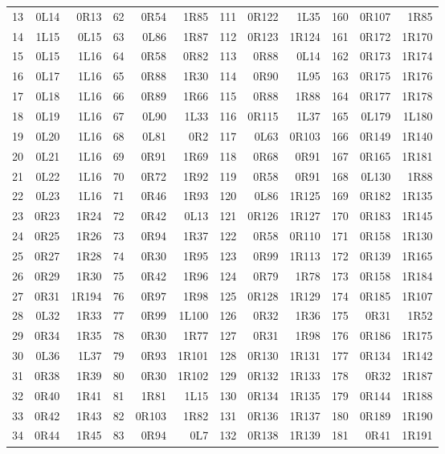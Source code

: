 \begin{center}
\begin{tabular}{@{}rrr@{\hspace{11pt}}rrr@{\hspace{11pt}}rrr@{\hspace{11pt}}rrr@{}}
13 & 0L14 & 0R13 & 62 & 0R54 & 1R85 & 111 & 0R122 & 1L35 & 160 & 0R107 & 1R85 \\
14 & 1L15 & 0L15 & 63 & 0L86 & 1R87 & 112 & 0R123 & 1R124 & 161 & 0R172 & 1R170 \\
15 & 0L15 & 1L16 & 64 & 0R58 & 0R82 & 113 & 0R88 & 0L14 & 162 & 0R173 & 1R174 \\
16 & 0L17 & 1L16 & 65 & 0R88 & 1R30 & 114 & 0R90 & 1L95 & 163 & 0R175 & 1R176 \\
17 & 0L18 & 1L16 & 66 & 0R89 & 1R66 & 115 & 0R88 & 1R88 & 164 & 0R177 & 1R178 \\
18 & 0L19 & 1L16 & 67 & 0L90 & 1L33 & 116 & 0R115 & 1L37 & 165 & 0L179 & 1L180 \\
19 & 0L20 & 1L16 & 68 & 0L81 & 0R2 & 117 & 0L63 & 0R103 & 166 & 0R149 & 1R140 \\
20 & 0L21 & 1L16 & 69 & 0R91 & 1R69 & 118 & 0R68 & 0R91 & 167 & 0R165 & 1R181 \\
21 & 0L22 & 1L16 & 70 & 0R72 & 1R92 & 119 & 0R58 & 0R91 & 168 & 0L130 & 1R88 \\
22 & 0L23 & 1L16 & 71 & 0R46 & 1R93 & 120 & 0L86 & 1R125 & 169 & 0R182 & 1R135 \\
23 & 0R23 & 1R24 & 72 & 0R42 & 0L13 & 121 & 0R126 & 1R127 & 170 & 0R183 & 1R145 \\
24 & 0R25 & 1R26 & 73 & 0R94 & 1R37 & 122 & 0R58 & 0R110 & 171 & 0R158 & 1R130 \\
25 & 0R27 & 1R28 & 74 & 0R30 & 1R95 & 123 & 0R99 & 1R113 & 172 & 0R139 & 1R165 \\
26 & 0R29 & 1R30 & 75 & 0R42 & 1R96 & 124 & 0R79 & 1R78 & 173 & 0R158 & 1R184 \\
27 & 0R31 & 1R194 & 76 & 0R97 & 1R98 & 125 & 0R128 & 1R129 & 174 & 0R185 & 1R107 \\
28 & 0L32 & 1R33 & 77 & 0R99 & 1L100 & 126 & 0R32 & 1R36 & 175 & 0R31 & 1R52 \\
29 & 0R34 & 1R35 & 78 & 0R30 & 1R77 & 127 & 0R31 & 1R98 & 176 & 0R186 & 1R175 \\
30 & 0L36 & 1L37 & 79 & 0R93 & 1R101 & 128 & 0R130 & 1R131 & 177 & 0R134 & 1R142 \\
31 & 0R38 & 1R39 & 80 & 0R30 & 1R102 & 129 & 0R132 & 1R133 & 178 & 0R32 & 1R187 \\
32 & 0R40 & 1R41 & 81 & 1R81 & 1L15 & 130 & 0R134 & 1R135 & 179 & 0R144 & 1R188 \\
33 & 0R42 & 1R43 & 82 & 0R103 & 1R82 & 131 & 0R136 & 1R137 & 180 & 0R189 & 1R190 \\
34 & 0R44 & 1R45 & 83 & 0R94 & 0L7 & 132 & 0R138 & 1R139 & 181 & 0R41 & 1R191 \\

\end{tabular}
\end{center}
